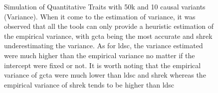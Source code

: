 \begin{figure}
{				\label{fig:50k10cQtvarI}
			}
			\caption[Simulation of Quantitative Traits with 50k  and 10 causal variants(Variance)]
			{Simulation of Quantitative Traits with 50k  and 10 causal variants (Variance).
			When it come to the estimation of variance, it was observed that all the tools can only provide a heuristic estimation of the empirical variance, with \gls{gcta} being the most accurate and \gls{shrek} underestimating the variance.
			As for \gls{ldsc}, the variance estimated were much higher than the empirical variance no matter if the intercept were fixed or not.
			It is worth noting that the empirical variance of \gls{gcta} were much lower than \gls{ldsc} and \gls{shrek} whereas the empirical variance of \gls{shrek} tends to be higher than \gls{ldsc} } 
			\label{fig:50k10cQtVar}
		\end{figure}
		
		
		
